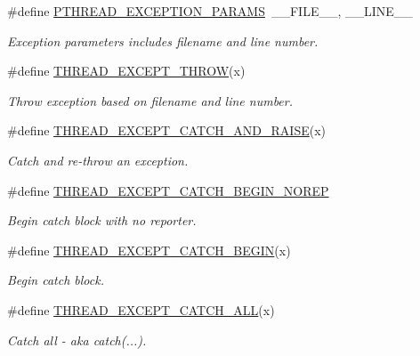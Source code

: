 \begin{DoxyCompactItemize}
\item 
\#define \hyperlink{group__EXCEPT__GROUP_gaf6a9cbd32371e5892a6b4190928651dd}{P\+T\+H\+R\+E\+A\+D\+\_\+\+E\+X\+C\+E\+P\+T\+I\+O\+N\+\_\+\+P\+A\+R\+A\+MS}~\+\_\+\+\_\+\+F\+I\+L\+E\+\_\+\+\_\+, \+\_\+\+\_\+\+L\+I\+N\+E\+\_\+\+\_\+
\begin{DoxyCompactList}\small\item\em Exception parameters includes filename and line number. \end{DoxyCompactList}\item 
\#define \hyperlink{group__EXCEPT__GROUP_ga5db5dc006d9e017998d2def9ce105503}{T\+H\+R\+E\+A\+D\+\_\+\+E\+X\+C\+E\+P\+T\+\_\+\+T\+H\+R\+OW}(x)
\begin{DoxyCompactList}\small\item\em Throw exception based on filename and line number. \end{DoxyCompactList}\item 
\#define \hyperlink{group__EXCEPT__GROUP_ga30ed89be31363fd6edbdf69c667f6a6e}{T\+H\+R\+E\+A\+D\+\_\+\+E\+X\+C\+E\+P\+T\+\_\+\+C\+A\+T\+C\+H\+\_\+\+A\+N\+D\+\_\+\+R\+A\+I\+SE}(x)
\begin{DoxyCompactList}\small\item\em Catch and re-\/throw an exception. \end{DoxyCompactList}\item 
\#define \hyperlink{group__EXCEPT__GROUP_ga0c52d227f70b6081ba66c3139a4e93f4}{T\+H\+R\+E\+A\+D\+\_\+\+E\+X\+C\+E\+P\+T\+\_\+\+C\+A\+T\+C\+H\+\_\+\+B\+E\+G\+I\+N\+\_\+\+N\+O\+R\+EP}
\begin{DoxyCompactList}\small\item\em Begin catch block with no reporter. \end{DoxyCompactList}\item 
\#define \hyperlink{group__EXCEPT__GROUP_gaf7630fb76915f40ee3d6f7499a20671d}{T\+H\+R\+E\+A\+D\+\_\+\+E\+X\+C\+E\+P\+T\+\_\+\+C\+A\+T\+C\+H\+\_\+\+B\+E\+G\+IN}(x)
\begin{DoxyCompactList}\small\item\em Begin catch block. \end{DoxyCompactList}\item 
\#define \hyperlink{group__EXCEPT__GROUP_gac9a9fa6b62369772230ad12ff2b51e89}{T\+H\+R\+E\+A\+D\+\_\+\+E\+X\+C\+E\+P\+T\+\_\+\+C\+A\+T\+C\+H\+\_\+\+A\+LL}(x)
\begin{DoxyCompactList}\small\item\em Catch all -\/ aka catch(...). \end{DoxyCompactList}\item 

\end{DoxyCompactItemize}
